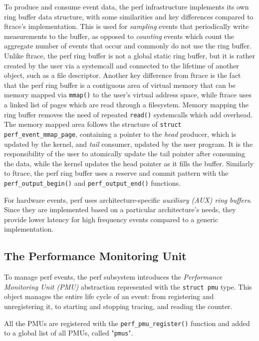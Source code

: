 To produce and consume event data, the perf infrastructure implements its own
ring buffer data structure, with some similarities and key differences compared
to ftrace's implementation. This is used for \textit{sampling} events that
periodically write measurements to the buffer, as opposed to \textit{counting}
events which count the aggregate number of events that occur and commonly do not
use the ring buffer. Unlike ftrace, the perf ring buffer is not a global static
ring buffer, but it is rather created by the user via a systemcall and connected
to the lifetime of another object, such as a file descriptor. Another key
difference from ftrace is the fact that the perf ring buffer is a contiguous
area of virtual memory that can be memory mapped via \verb|mmap()| to the user's
virtual address space, while ftrace uses a linked list of pages which are read
through a filesystem. Memory mapping the ring buffer removes the need of
repeated \verb|read()| systemcalls which add overhead. The memory mapped area
follows the structure of \verb|struct perf_event_mmap_page|, containing a
pointer to the \textit{head} producer, which is updated by the kernel, and
\textit{tail} consumer, updated by the user program. It is the responsibility of
the user to atomically update the tail pointer after consuming the data, while
the kernel updates the head pointer as it fills the buffer. Similarly to ftrace,
the perf ring buffer uses a reserve and commit pattern with the
\verb|perf_output_begin()| and \verb|perf_output_end()| functions.

For hardware events, perf uses architecture-specific \textit{auxiliary (AUX)
ring buffers}. Since they are implemented based on a particular architecture's
needs, they provide lower latency for high frequency events compared to a
generic implementation.

\subsection{The Performance Monitoring Unit}

To manage perf events, the perf subsystem introduces the \textit{Performance
Monitoring Unit (PMU)} abstraction represented with the \verb|struct pmu| type.
This object manages the entire life cycle of an event: from registering and
unregistering it, to starting and stopping tracing, and reading the counter.

All the PMUs are registered with the \verb|perf_pmu_register()| function and
added to a global list of all PMUs, called "\verb|pmus|".

